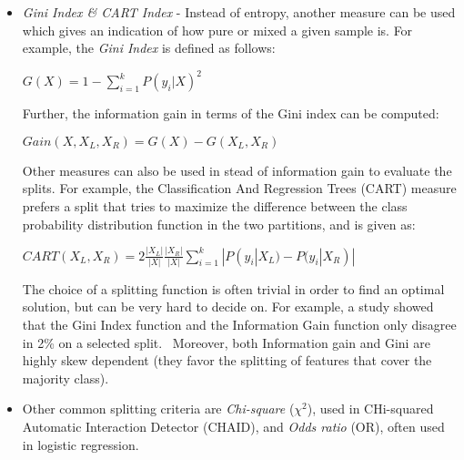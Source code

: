 \begin{itemize}
\newpage
\item \textit{Gini Index \& CART Index} - Instead of entropy, another measure can be used which gives an indication of how pure or mixed a given sample is. For example, the \textit{Gini Index} is defined as follows:
\begin{center}\(G(X) = 1 - \sum_{i=1}^k{P(y_i|X)^2}\)\end{center}
Further, the information gain in terms of the Gini index can be computed:
\begin{center}\( Gain(X,X_{L},X_{R})= G(X)-G(X_{L},X_{R})\)\end{center}
Other measures can also be used in stead of information gain to evaluate the splits.  For example, the Classification And Regression Trees (CART) measure prefers a split that tries to maximize the difference between the class probability distribution function in the two partitions, and is given as:
\begin{center}\(CART(X_L,X_R) = 2 \frac{|X_L|}{|X|} \frac{|X_R|}{|X|} \sum_{i=1}^k{|P(y_i|X_L)-P(y_i|X_R)|}\)\end{center}
The choice of a splitting function is often trivial in order to find an optimal solution, but can be very hard to decide on.  For example, a study showed that the Gini Index function and the Information Gain function only disagree in 2\% on a selected split.~\cite{gini-ig}  Moreover, both Information gain and Gini are highly skew dependent (they favor the splitting of features that cover the majority class).
\item Other common splitting criteria are \textit{Chi-square} (\(\chi ^2\)), used in CHi-squared Automatic Interaction Detector (CHAID), and \textit{Odds ratio} (OR), often used in logistic regression.
\end{itemize}

